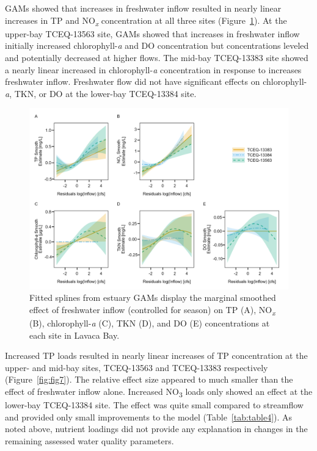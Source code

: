 \documentclass[sn-basic,referee,lineno,pdflatex]{sn-jnl}
\begin{document}
GAMs showed that increases in freshwater inflow resulted in nearly
linear increases in TP and NO\textsubscript{\emph{x}} concentration at
all three sites (Figure~\ref{fig:fig6}). At the upper-bay TCEQ-13563
site, GAMs showed that increases in freshwater inflow initially
increased chlorophyll-\emph{a} and DO concentration but concentrations
leveled and potentially decreased at higher flows. The mid-bay
TCEQ-13383 site showed a nearly linear increased in chlorophyll-\emph{a}
concentration in response to increases freshwater inflow. Freshwater
flow did not have significant effects on chlorophyll-\emph{a}, TKN, or
DO at the lower-bay TCEQ-13384 site.

\begin{figure}

{\centering \includegraphics[width=1\linewidth,]{Schramm-2023-05-AS_files/figure-latex/fig6-1} 

}

\caption{Fitted splines from estuary GAMs display the marginal smoothed effect of freshwater inflow (controlled for season) on TP (A), NO\textit{\textsubscript{x}} (B), chlorophyll-\textit{a} (C), TKN (D), and DO (E) concentrations at each site in Lavaca Bay.}\label{fig:fig6}
\end{figure}

Increased TP loads resulted in nearly linear increases of TP
concentration at the upper- and mid-bay sites, TCEQ-13563 and TCEQ-13383
respectively (Figure~\ref{fig:fig7}). The relative effect size appeared
to much smaller than the effect of freshwater inflow alone. Increased
NO\textsubscript{3} loads only showed an effect at the lower-bay
TCEQ-13384 site. The effect was quite small compared to streamflow and
provided only small improvements to the model (Table~\ref{tab:table4}).
As noted above, nutrient loadings did not provide any explanation in
changes in the remaining assessed water quality parameters.
\end{document}
